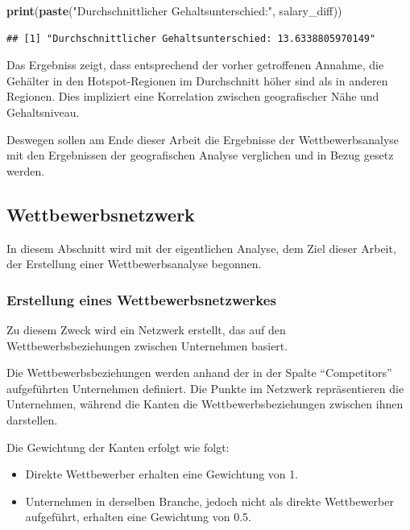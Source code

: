 \documentclass[
]{article}
\newenvironment{Shaded}{\begin{snugshade}}{\end{snugshade}}
\newcommand{\FunctionTok}[1]{\textcolor[rgb]{0.13,0.29,0.53}{\textbf{#1}}}
\newcommand{\NormalTok}[1]{#1}
\newcommand{\StringTok}[1]{\textcolor[rgb]{0.31,0.60,0.02}{#1}}
\providecommand{\tightlist}{%
  \setlength{\itemsep}{0pt}\setlength{\parskip}{0pt}}
\begin{document}
\begin{Shaded}
\begin{Highlighting}[]
\FunctionTok{print}\NormalTok{(}\FunctionTok{paste}\NormalTok{(}\StringTok{"Durchschnittlicher Gehaltsunterschied:"}\NormalTok{, salary\_diff))}
\end{Highlighting}
\end{Shaded}

\begin{verbatim}
## [1] "Durchschnittlicher Gehaltsunterschied: 13.6338805970149"
\end{verbatim}

Das Ergebniss zeigt, dass entsprechend der vorher getroffenen Annahme,
die Gehälter in den Hotspot-Regionen im Durchschnitt höher sind als in
anderen Regionen. Dies impliziert eine Korrelation zwischen
geografischer Nähe und Gehaltsniveau.

Deswegen sollen am Ende dieser Arbeit die Ergebnisse der
Wettbewerbsanalyse mit den Ergebnissen der geografischen Analyse
verglichen und in Bezug gesetz werden.

\subsection{Wettbewerbsnetzwerk}\label{wettbewerbsnetzwerk}

In diesem Abschnitt wird mit der eigentlichen Analyse, dem Ziel dieser
Arbeit, der Erstellung einer Wettbewerbsanalyse begonnen.

\subsubsection{Erstellung eines
Wettbewerbsnetzwerkes}\label{erstellung-eines-wettbewerbsnetzwerkes}

Zu diesem Zweck wird ein Netzwerk erstellt, das auf den
Wettbewerbsbeziehungen zwischen Unternehmen basiert.

Die Wettbewerbsbeziehungen werden anhand der in der Spalte
``Competitors'' aufgeführten Unternehmen definiert. Die Punkte im
Netzwerk repräsentieren die Unternehmen, während die Kanten die
Wettbewerbsbeziehungen zwischen ihnen darstellen.

Die Gewichtung der Kanten erfolgt wie folgt:

\begin{itemize}
\tightlist
\item
  Direkte Wettbewerber erhalten eine Gewichtung von 1.
\item
  Unternehmen in derselben Branche, jedoch nicht als direkte
  Wettbewerber aufgeführt, erhalten eine Gewichtung von 0.5.
\end{itemize}
\end{document}

